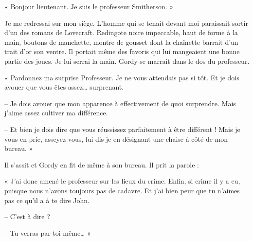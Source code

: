 « Bonjour lieutenant. Je suis le professeur Smitherson. »

Je me redressai sur mon siège. L'homme qui se tenait devant moi paraissait sortir d'un des romans de Lovecraft.
Redingote noire impeccable, haut de forme à la main, boutons de manchette, montre de gousset dont la chaînette barrait
d'un trait d'or son ventre. Il portait même des favoris qui lui mangeaient une bonne partie des joues. Je lui serrai 
la main. Gordy se marrait dans le dos du professeur.

« Pardonnez ma surprise Professeur. Je ne vous attendais pas si tôt. Et je dois avouer que vous êtes assez\ldots{}
surprenant. 

-- Je dois avouer que mon apparence à effectivement de quoi surprendre. Mais j'aime assez cultiver ma différence.

-- Et bien je dois dire que vous réussissez parfaitement à être différent ! Mais je vous en prie, asseyez-vous, lui
dis-je en désignant une chaise à côté de mon bureau. »

Il s'assit et Gordy en fit de même à son bureau. Il prit la parole :

« J'ai donc amené le professeur sur les lieux du crime. Enfin, si crime il y a eu, puisque nous n'avons toujours pas de
cadavre. Et j'ai bien peur que tu n'aimes pas ce qu'il a à te dire John.

-- C'est à dire ?

-- Tu verras par toi même\ldots{} »
